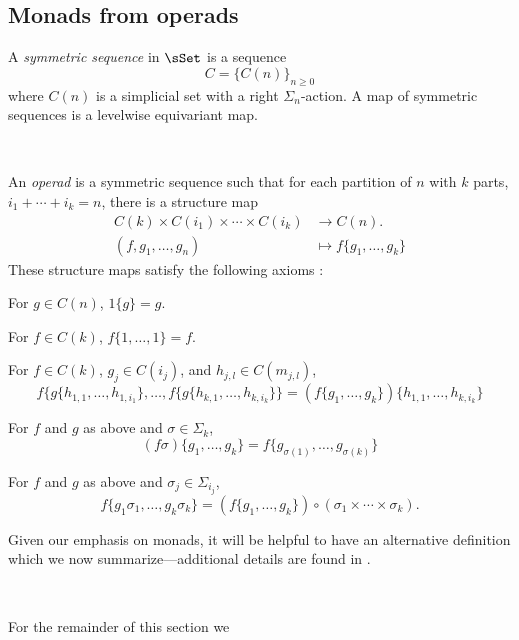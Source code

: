 \documentclass[leqno,oneside,english]{elsarticle}
\newcounter{enumisaved}
\newlength{\thmsaved}
\newlength{\thmnow}
\begin{document}
\subsection{Monads from operads}
\label{sec:monads-from-operads}
A \emph{symmetric sequence} in $\sSet$ is a sequence 
\[
C = \{C(n)\}_{n \ge 0}
\] 
where $C(n)$ is a simplicial set with a right $\Sigma_n$-action.  A map of
symmetric sequences is a levelwise equivariant map.

{{    {}  \ifshowcomplete
  \ 
  { An \emph{operad} is a symmetric sequence such
that for each partition of $n$ with $k$ parts, $i_1 + \cdots + i_k =
n$, there is a structure map
\begin{align*}
  C(k) \times C(i_1) \times \cdots \times C(i_k) & \longrightarrow C(n).\\
  (f , g_1, \ldots , g_n) & \longmapsto f\{g_1, \ldots , g_k\}
\end{align*}
These structure maps satisfy the following axioms \cite{May72}:
{{\ifshowsaveblocks
{}
\fi}}{} 
\begin{hypothenumerate}
\item For $g \in C(n)$, $1\{g\} = g$.
\item For $f \in C(k)$, $f\{1, \ldots , 1\} = f$.
\item For $f \in C(k)$, $g_j \in C(i_j)$, and $h_{j,l} \in
  C(m_{j,l})$,
  \[
  f\{g\{h_{1,1}, \ldots, h_{1,i_1}\}, \ldots, f\{g\{h_{k,1}, \ldots, h_{k,i_k}\}\}
  = (f\{g_1, \ldots, g_k\})\{h_{1,1}, \ldots, h_{k, i_k}\}
  \]
\item For $f$ and $g$ as above and $\sigma \in \Sigma_k$,
  \[
  (f\sigma)\{g_1, \ldots, g_k\} = f\{g_{\sigma(1)}, \ldots,
  g_{\sigma(k)}\}
  \]
\item For $f$ and $g$ as above and $\sigma_j \in \Sigma_{i_j}$,
  \[
  f\{g_1 \sigma_1 , \ldots , g_k \sigma_k\} = (f\{g_1, \ldots,
  g_k\}) \circ (\sigma_1 \times \cdots \times \sigma_k).
  \]
\end{hypothenumerate}

Given our emphasis on monads, it will be helpful to have an
alternative definition which we now summarize---additional details are
found in \cite[\S~11]{Rez97}. 
}
  {}
  \ 
  \ifthenelse{\lengthtest{\thmnow > \thmsaved}}{
    
    \setcounter{thm}{{\strip@pt{\thmsaved}}}  
  }{
    
  }
  \setcounter{enumi}{\theenumisaved}
    \else  \fi
}}{} For the remainder of this section we
\end{document}
